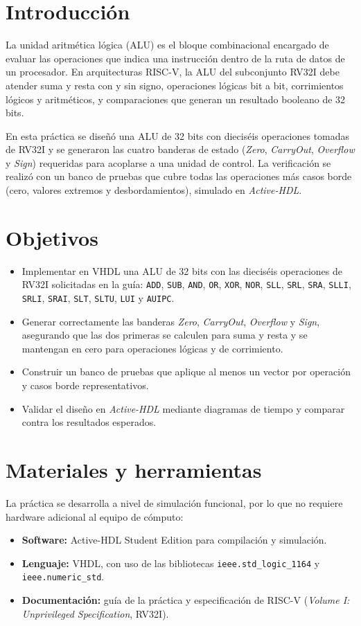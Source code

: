 \documentclass[12pt,letterpaper]{article}
\begin{document}
\section{Introducción}
La unidad aritmética lógica (ALU) es el bloque combinacional encargado de evaluar las operaciones que indica una instrucción dentro de la ruta de datos de un procesador. En arquitecturas RISC-V, la ALU del subconjunto RV32I debe atender suma y resta con y sin signo, operaciones lógicas bit a bit, corrimientos lógicos y aritméticos, y comparaciones que generan un resultado booleano de 32 bits.

En esta práctica se diseñó una ALU de 32 bits con dieciséis operaciones tomadas de RV32I y se generaron las cuatro banderas de estado (\textit{Zero}, \textit{CarryOut}, \textit{Overflow} y \textit{Sign}) requeridas para acoplarse a una unidad de control. La verificación se realizó con un banco de pruebas que cubre todas las operaciones más casos borde (cero, valores extremos y desbordamientos), simulado en \textit{Active-HDL}.

\section{Objetivos}
\begin{itemize}
  \item Implementar en VHDL una ALU de 32 bits con las dieciséis operaciones de RV32I solicitadas en la guía: \texttt{ADD}, \texttt{SUB}, \texttt{AND}, \texttt{OR}, \texttt{XOR}, \texttt{NOR}, \texttt{SLL}, \texttt{SRL}, \texttt{SRA}, \texttt{SLLI}, \texttt{SRLI}, \texttt{SRAI}, \texttt{SLT}, \texttt{SLTU}, \texttt{LUI} y \texttt{AUIPC}.
  \item Generar correctamente las banderas \textit{Zero}, \textit{CarryOut}, \textit{Overflow} y \textit{Sign}, asegurando que las dos primeras se calculen para suma y resta y se mantengan en cero para operaciones lógicas y de corrimiento.
  \item Construir un banco de pruebas que aplique al menos un vector por operación y casos borde representativos.
  \item Validar el diseño en \textit{Active-HDL} mediante diagramas de tiempo y comparar contra los resultados esperados.
\end{itemize}

\section{Materiales y herramientas}
La práctica se desarrolla a nivel de simulación funcional, por lo que no requiere hardware adicional al equipo de cómputo:
\begin{itemize}
  \item \textbf{Software:} Active-HDL Student Edition para compilación y simulación.
  \item \textbf{Lenguaje:} VHDL, con uso de las bibliotecas \texttt{ieee.std\_logic\_1164} y \texttt{ieee.numeric\_std}.
  \item \textbf{Documentación:} guía de la práctica y especificación de RISC-V (\textit{Volume I: Unprivileged Specification}, RV32I).
\end{itemize}
\end{document}
